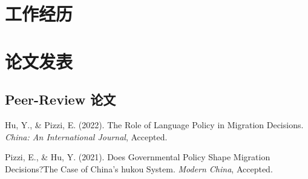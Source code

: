 \documentclass[11pt, a4paper]{awesome-cv}
\begin{document}
\hypertarget{ux5de5ux4f5cux7ecfux5386}{%
\section{工作经历}\label{ux5de5ux4f5cux7ecfux5386}}

\begin{cventries}
    \vspace{-4.0mm}
    \vspace{-4.0mm}
    \vspace{-4.0mm}
    \vspace{-4.0mm}
    \vspace{-4.0mm}
    \vspace{-4.0mm}
    \vspace{-4.0mm}
\end{cventries}

\hypertarget{ux8bbaux6587ux53d1ux8868}{%
\section{论文发表}\label{ux8bbaux6587ux53d1ux8868}}

\hypertarget{peer-review-ux8bbaux6587}{%
\subsection{\texorpdfstring{\textbf{Peer-Review
论文}}{Peer-Review 论文}}\label{peer-review-ux8bbaux6587}}

\begingroup
\setlength{\parindent}{-0.5in}
\setlength{\leftskip}{0.5in}

\hypertarget{refs_published}{}
\leavevmode\hypertarget{ref-HuPizzi2022}{}%
Hu, Y., \& Pizzi, E. (2022). The {Role} of {Language Policy} in
{Migration Decisions}. \emph{China: An International Journal}, Accepted.

\leavevmode\hypertarget{ref-PizziHu2021}{}%
Pizzi, E., \& Hu, Y. (2021). Does {Governmental Policy Shape Migration
Decisions}?{The Case} of {China}'s hukou {System}. \emph{Modern China},
Accepted.
\end{document}
